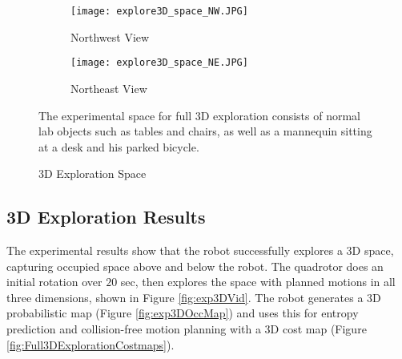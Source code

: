 \begin{figure}[!t]
\centering
    	\begin{subfigure}[t]{0.44\columnwidth}
           	\centering
          	\texttt{[image: explore3D\_space\_NW.JPG]}
        		\caption{Northwest View}
    	\end{subfigure}
	\hspace*{0.05\columnwidth}
    	\begin{subfigure}[t]{0.44\columnwidth}
           	\centering
          	\texttt{[image: explore3D\_space\_NE.JPG]}
        		\caption{Northeast View}
    	\end{subfigure}
	\caption{3D Exploration Space}
	\medskip
	\small
	The experimental space for full 3D exploration consists of normal lab objects such as tables and chairs, as well as a mannequin sitting at a desk and his parked bicycle.
	\label{fig:Full3DExplorationEnvironment}
\end{figure}

\subsection{3D Exploration Results}

The experimental results show that the robot successfully explores a 3D space, capturing occupied space above and below the robot. The quadrotor does an initial rotation over $20$ sec, then explores the space with planned motions in all three dimensions, shown in Figure \ref{fig:exp3DVid}. The robot generates a 3D probabilistic map (Figure \ref{fig:exp3DOccMap}) and uses this for entropy prediction and collision-free motion planning with a 3D cost map (Figure \ref{fig:Full3DExplorationCostmaps}).

